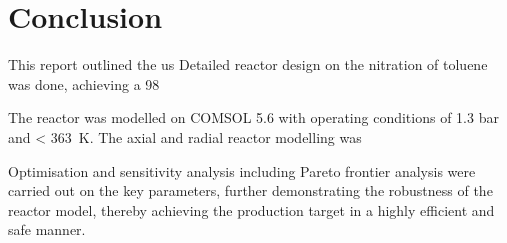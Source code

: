 \section{Conclusion} \label{sec:conclusion}
This report outlined the us
Detailed reactor design on the nitration of toluene was done, achieving a \SI{98}{}

The reactor was modelled on COMSOL 5.6 with operating conditions of 1.3 bar and \SI{< 363}{\K}.
The axial and radial reactor modelling was 

Optimisation and sensitivity analysis including Pareto frontier analysis were carried out on the key parameters, further demonstrating the robustness of the reactor model, thereby achieving the production target in a highly efficient and safe manner. 